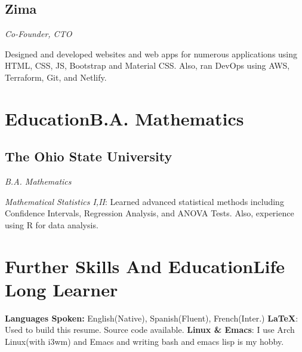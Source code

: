 \documentclass[letterpaper,11pt]{article}
\begin{document}
\subsection{Zima}
\textit{Co-Founder, CTO}
\vspace{2mm}
\begin{adjustwidth}{1cm}{1cm}
Designed and developed websites and web
apps for numerous applications using
HTML, CSS, JS, Bootstrap and Material CSS.
Also, ran DevOps using AWS, Terraform,
Git, and Netlify.
\end{adjustwidth}
\section{Education\hfill B.A. Mathematics}
\subsection{The Ohio State University}
\textit{B.A. Mathematics}
\vspace{2mm}
\begin{adjustwidth}{1cm}{1cm}
\textit{Mathematical Statistics I,II}: Learned advanced statistical methods including Confidence Intervals, Regression Analysis, and ANOVA Tests. Also, experience using R for data analysis.
\end{adjustwidth}
\section{Further Skills And Education\hfill Life Long Learner}
\textbf{Languages Spoken: } English(Native), Spanish(Fluent), French(Inter.)
\newline
\textbf{\LaTeX}: Used to build this resume. Source code available.
\newline
\textbf{Linux \& Emacs}: I use Arch Linux(with i3wm) and Emacs and writing bash and emacs lisp is my hobby.
\newline
\end{document}
